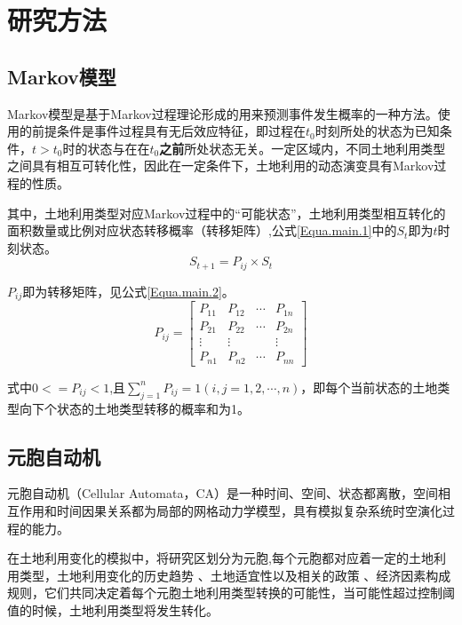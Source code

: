 \documentclass[10pt,aspectratio=169]{beamer} %
\begin{document}
	\section{研究方法}
	\subsection{Markov模型}
	\begin{frame}[c]{\secname}{\subsecname}
		Markov模型是基于Markov过程理论形成的用来预测事件发生概率的一种方法。使用的前提条件是事件过程具有无后效应特征，即过程在$t_0$时刻所处的状态为已知条件，$t>t_0$时的状态与在在$t_0$\textbf{之前}所处状态无关。一定区域内，不同土地利用类型之间具有相互可转化性\cite{muller1994markov,何春阳2004中国北方未来土地利用变化情景模拟}，因此在一定条件下，土地利用的动态演变具有Markov过程的性质。
		\par
		其中，土地利用类型对应Markov过程中的“可能状态”，土地利用类型相互转化的面积数量或比例对应状态转移概率（转移矩阵）,公式\ref{Equa.main.1}中的$ S_{t}$即为$t$时刻状态。
		\begin{equation}\label{Equa.main.1}
			S_{t+1}=P_{i j} \times S_{t}
		\end{equation}
		\par
		$P_{i j} $即为转移矩阵，见公式\ref{Equa.main.2}。
		\begin{equation}\label{Equa.main.2}
		P_{i j}=\left[\begin{array}{cccc}
			P_{11} & P_{12} & \cdots & P_{1 n} \\
			P_{21} & P_{22} & \cdots & P_{2 n} \\
			\vdots & \vdots & & \vdots \\
			P_{n 1} & P_{n 2} & \cdots & P_{n n}
		\end{array}\right]
		\end{equation}
		\par
		式中$0<=P_{ij}<1$,且$\sum_{j=1}^{n} P_{i j}=1(i, j=1,2, \cdots, n)$，即每个当前状态的土地类型向下个状态的土地类型转移的概率和为1。
		
	\end{frame}

	\subsection{元胞自动机}
	\begin{frame}[c]{\secname}{\subsecname}
	元胞自动机（Cellular Automata，CA）是一种时间、空间、状态都离散，空间相互作用和时间因果关系都为局部的网格动力学模型，具有模拟复杂系统时空演化过程的能力\cite{孙战利1999空间复杂性与地理元胞自动机模拟研究}。
	\par
	在土地利用变化的模拟中，将研究区划分为元胞,每个元胞都对应着一定的土地利用类型，土地利用变化的历史趋势 、土地适宜性以及相关的政策 、经济因素构成规则，它们共同决定着每个元胞土地利用类型转换的可能性，当可能性超过控制阈值的时候，土地利用类型将发生转化\cite{熊利亚2005基于地理元胞自动机的土地利用变化研究}。
	\end{frame}
\end{document}
